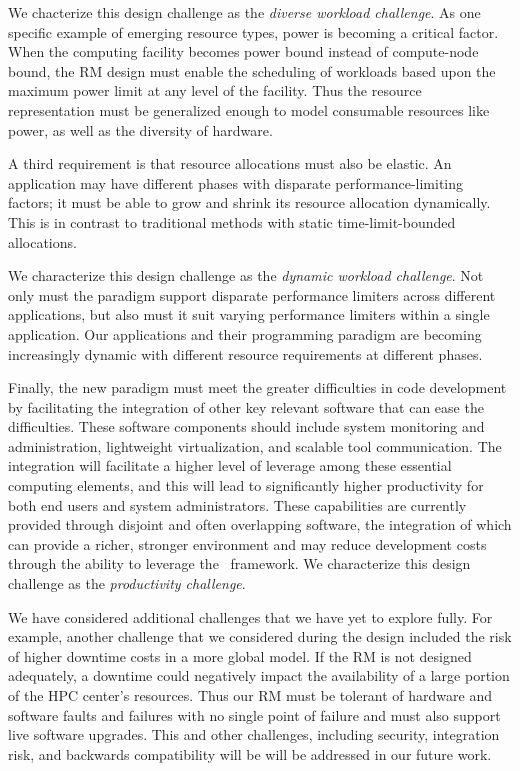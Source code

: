 We chacterize this design challenge as the {\em diverse workload
challenge}.   As one specific example of emerging resource types,
power is becoming a critical factor. When the computing facility
becomes power bound instead of compute-node bound, the RM design
must enable the scheduling of workloads based upon the maximum
power limit at any level of the facility. Thus the resource
representation must be generalized enough to model consumable
resources like power, as well as the diversity of hardware.

A third requirement is that resource allocations
must also be elastic. An application may have different
phases with disparate performance-limiting factors;
it must be able to grow and shrink its resource allocation
dynamically.  This is in contrast to traditional methods with
static time-limit-bounded allocations.

We characterize this design challenge as the {\em dynamic workload
challenge}.  
Not only must the paradigm support disparate performance limiters
across different applications, but also must it suit varying
performance limiters within a single application. Our applications
and their programming paradigm are becoming increasingly dynamic with
different resource requirements at different phases.

Finally, the new paradigm must meet the greater difficulties
in code development by facilitating the integration 
of other key relevant software that can ease the difficulties. 
These software components should include system monitoring
and administration, lightweight virtualization,
and scalable tool communication.
The integration will facilitate a higher level of
leverage among these essential computing elements,
and this will lead to significantly higher productivity
for both end users and system administrators.
These capabilities are currently provided
through disjoint and often overlapping software,
the integration of which can provide a richer, stronger environment
and may reduce development costs through the ability to leverage
the \flux\ framework.
We characterize this design challenge as the {\em productivity challenge}.

We have considered additional challenges that we
have yet to explore fully. For example,
another challenge that we considered during the design included
the risk of higher downtime costs in a more global model.
If the RM is not designed adequately, a downtime could negatively
impact the availability of a large portion of the HPC center’s
resources. Thus our RM must be tolerant of hardware and software
faults and failures with no single point of failure and must
also support live software upgrades. This and other challenges,
including security, integration risk, and backwards compatibility will be 
will be addressed in our future work.

%

